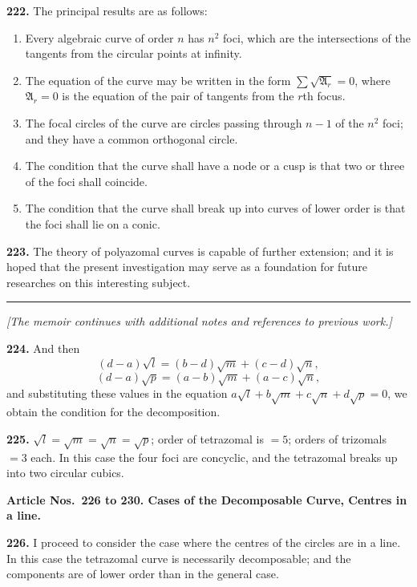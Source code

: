 \documentclass[12pt,a4paper]{article}
\theoremstyle{definition}
\begin{document}
\noindent\textbf{222.} The principal results are as follows:
\begin{enumerate}[label=(\arabic*)]
\item Every algebraic curve of order $n$ has $n^2$ foci, which are the intersections of the
tangents from the circular points at infinity.
\item The equation of the curve may be written in the form $\sum\sqrt{\mathfrak{A}_r} = 0$, where
$\mathfrak{A}_r = 0$ is the equation of the pair of tangents from the $r$th focus.
\item The focal circles of the curve are circles passing through $n - 1$ of the $n^2$ foci;
and they have a common orthogonal circle.
\item The condition that the curve shall have a node or a cusp is that two or three
of the foci shall coincide.
\item The condition that the curve shall break up into curves of lower order is that
the foci shall lie on a conic.
\end{enumerate}

\noindent\textbf{223.} The theory of polyazomal curves is capable of further extension; and it
is hoped that the present investigation may serve as a foundation for future researches
on this interesting subject.

\vspace{1em}
\begin{center}
\rule{0.5\textwidth}{0.4pt}
\end{center}
\vspace{1em}

\noindent\textit{[The memoir continues with additional notes and references to previous work.]}

\newpage
\noindent\textbf{224.} And then
\[
(d - a)\sqrt{l} = (b - d)\sqrt{m} + (c - d)\sqrt{n},
\]
\[
(d - a)\sqrt{p} = (a - b)\sqrt{m} + (a - c)\sqrt{n},
\]
and substituting these values in the equation $a\sqrt{l} + b\sqrt{m} + c\sqrt{n} + d\sqrt{p} = 0$,
we obtain the condition for the decomposition.

\noindent\textbf{225.} $\sqrt{l} = \sqrt{m} = \sqrt{n} = \sqrt{p}$; order of tetrazomal is $= 5$; orders of trizomals
$= 3$ each. In this case the four foci are concyclic, and the tetrazomal breaks up into
two circular cubics.

\vspace{0.5em}
\noindent\textbf{Article Nos.~226 to 230. Cases of the Decomposable Curve, Centres in a line.}

\vspace{0.3em}
\noindent\textbf{226.} I proceed to consider the case where the centres of the circles are in a
line. In this case the tetrazomal curve is necessarily decomposable; and the components
are of lower order than in the general case.
\end{document}
